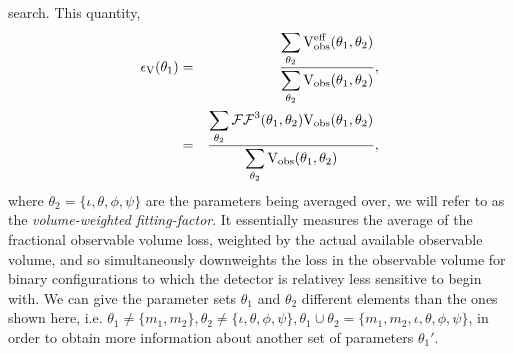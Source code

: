 search. This quantity,
\begin{eqnarray}\label{eq:epsilondef}
 \epsilon_{\mathrm{V}} (\theta_1)&=& \dfrac{\displaystyle\sum\limits_{\mathrm{\theta_2}}\mathrm{V}^{\mathrm{eff}}_{\mathrm{obs}}(\theta_1,\theta_2)}{\displaystyle\sum\limits_{\mathrm{\theta_2}}\mathrm{V}_{\mathrm{obs}}(\theta_1,\theta_2)},\nonumber \\ 
 &=& \dfrac{\displaystyle\sum\limits_{\mathrm{\theta_2}}\mathcal{FF}^3(\theta_1,\theta_2)\mathrm{V}_{\mathrm{obs}}(\theta_1,\theta_2)}{\displaystyle\sum\limits_{\mathrm{\theta_2}}\mathrm{V}_{\mathrm{obs}}(\theta_1,\theta_2)}, 
\end{eqnarray}
where $\theta_2 = \{\iota,\theta,\phi,\psi\}$ are the parameters being
averaged over,
we will refer to as the \textit{volume-weighted fitting-factor}. It
essentially measures the average of the fractional observable volume
loss, weighted by the actual available observable volume, and so simultaneously 
downweights the loss in the observable volume for binary configurations
to which the detector is relativey less sensitive to begin with.
We can give the parameter sets $\theta_1$ and $\theta_2$ different elements than the ones shown here, i.e. $\theta_1 \neq \{m_1,m_2\}, \theta_2 \neq \{\iota,\theta,\phi,\psi\}, \theta_1 \cup \theta_2 = \{m_1,m_2,\iota,\theta,\phi,\psi\}$, in order to obtain more information about another set of parameters $\theta_1'$.

